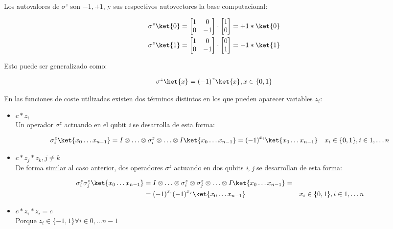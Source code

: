 Los autovalores de $\sigma^z$ son $-1, +1$, y sus respectivos autovectores la base computacional:

\begin{align}
  \sigma^z\ket{0} = \begin{bmatrix} 1 & 0 \\ 0 & -1 \end{bmatrix} \cdot \begin{bmatrix} 1 \\ 0 \end{bmatrix} = +1*\ket{0} \nonumber \\
  \sigma^z\ket{1} = \begin{bmatrix} 1 & 0 \\ 0 & -1 \end{bmatrix} \cdot \begin{bmatrix} 0 \\ 1 \end{bmatrix} = -1*\ket{1}
\end{align}

Esto puede ser generalizado como:

\begin{align}
  \sigma^z\ket{x} = {(-1)}^x\ket{x}, x \in \{0, 1\}
\end{align}

En las funciones de coste utilizadas existen dos términos distintos en los que pueden aparecer variables $z_i$:
\begin{itemize}
\item $c*z_i$ \\
  Un operador $\sigma^z$ actuando en el qubit \textit{i} se desarrolla de esta forma:

  \begin{align}\label{eq:8-demostracion-z_i}
    &\sigma^z_i \ket{x_0 \ldots x_{n-1}} = I \otimes \ldots \otimes \sigma^z_i \otimes \ldots \otimes I \ket{x_0 \ldots x_{n-1}} = {(-1)}^{x_i} \ket{x_0 \ldots x_{n-1}}     & x_i \in \{0, 1\}, i \in 1, \ldots n
  \end{align}
  
\item $c*z_j*z_k, j \ne k$ \\
  De forma similar al caso anterior, dos operadores $\sigma^z$ actuando en dos qubits \textit{i}, \textit{j} se desarrollan de esta forma:

  \begin{align}\label{eq:8-demostracion-z_i_j}
    \sigma^z_i \sigma^z_j \ket{x_0 \ldots x_{n-1}} &= I \otimes \ldots \otimes \sigma^z_i \otimes \sigma^z_j \otimes \ldots \otimes I \ket{x_0 \ldots x_{n-1}} = \nonumber \\
                                    &= {(-1)}^{x_i} {(-1)}^{x_j} \ket{x_0 \ldots x_{n-1}}     & x_i \in \{0, 1\}, i \in 1, \ldots n
  \end{align}

\item $c*z_i*z_i = c$ \\
  Porque $z_i \in \{-1, 1\} \forall i \in 0, \ldots n - 1$

\end{itemize}


